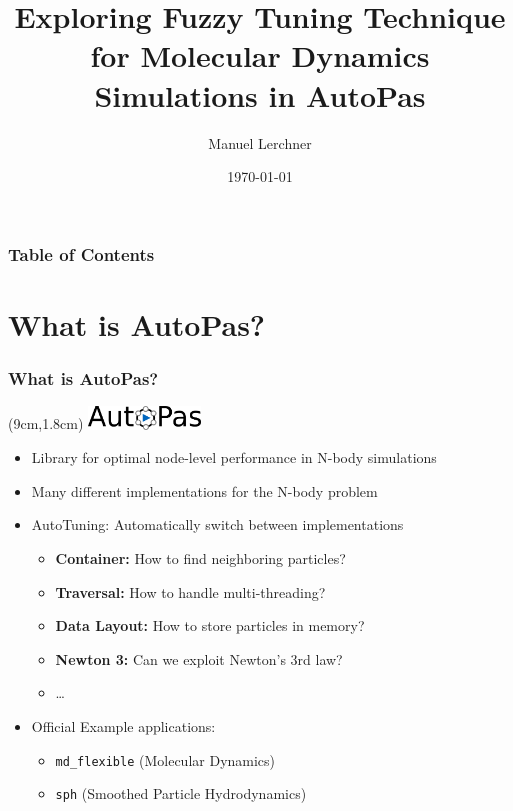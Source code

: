 \documentclass[
	10pt,
	t		%
]{beamer}
\title{Exploring Fuzzy Tuning Technique for Molecular Dynamics Simulations in AutoPas}
\author{Manuel Lerchner}
\date{\today}
\begin{document}
\maketitle

\begin{frame}
	\frametitle{Table of Contents}
	\tableofcontents
\end{frame}


\section{What is AutoPas?}
\begin{frame}
	\frametitle{What is AutoPas?}

	\begin{textblock*}{5cm}(9cm,1.8cm)
		\includegraphics[width=3cm]{figures/AutoPasLogo}
	\end{textblock*}


	\begin{itemize}
		\item Library for optimal node-level performance in N-body simulations
		\item Many different implementations for the N-body problem
		\item AutoTuning: Automatically switch between implementations
		      \begin{itemize}
			      \item \textbf{Container:} How to find neighboring particles?
			      \item \textbf{Traversal:} How to handle multi-threading?
			      \item \textbf{Data Layout:} How to store particles in memory?
			      \item \textbf{Newton 3:} Can we exploit Newton's 3rd law?
			      \item \dots
		      \end{itemize}
		\item Official Example applications:
		      \begin{itemize}
			      \item \texttt{md\_flexible} (Molecular Dynamics)
			      \item \texttt{sph} (Smoothed Particle Hydrodynamics)
		      \end{itemize}
	\end{itemize}
\end{frame}
\end{document}
